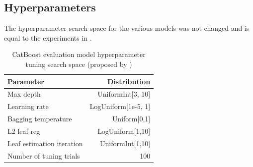 \subsection{Hyperparameters}
The hyperparameter search space for the various models was not changed and is equal to the experiments in \cite{kotelnikov2022TabDDPMModellingTabular}.
\begin{table}[h]
	\centering
	\begin{tabular}{lr}
		\toprule
		Parameter                 & Distribution        \\
		\midrule
		Max depth                 & UniformInt[3, 10]   \\
		Learning rate             & LogUniform[1e-5, 1] \\
		Bagging temperature       & Uniform[0,1]        \\
		L2 leaf reg               & LogUniform[1,10]    \\
		Leaf estimation iteration & UniformInt[1,10]    \\
		\midrule
		Number of tuning trials   & 100                 \\
		\bottomrule
	\end{tabular}
	\caption{CatBoost evaluation model hyperparameter tuning search space (proposed by \cite{gorishniy2021RevisitingDeepLearning})}
	\label{tab:catboost_tune}
\end{table}


